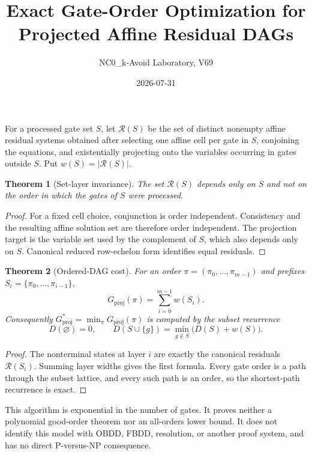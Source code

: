 \documentclass[11pt]{article}
\newtheorem{theorem}{Theorem}
\begin{document}
\title{Exact Gate-Order Optimization for Projected Affine Residual DAGs}
\author{NC0\_k-Avoid Laboratory, V69}
\date{2026-07-31}
\maketitle

For a processed gate set $S$, let $\mathcal R(S)$ be the set of distinct nonempty affine residual systems obtained after selecting one affine cell per gate in $S$, conjoining the equations, and existentially projecting onto the variables occurring in gates outside $S$. Put $w(S)=|\mathcal R(S)|$.

\begin{theorem}[Set-layer invariance]
The set $\mathcal R(S)$ depends only on $S$ and not on the order in which the gates of $S$ were processed.
\end{theorem}
\begin{proof}
For a fixed cell choice, conjunction is order independent. Consistency and the resulting affine solution set are therefore order independent. The projection target is the variable set used by the complement of $S$, which also depends only on $S$. Canonical reduced row-echelon form identifies equal residuals.
\end{proof}

\begin{theorem}[Ordered-DAG cost]
For an order $\pi=(\pi_0,\ldots,\pi_{m-1})$ and prefixes $S_i=\{\pi_0,\ldots,\pi_{i-1}\}$,
\[
G_{\mathrm{proj}}(\pi)=\sum_{i=0}^{m-1} w(S_i).
\]
Consequently $G^*_{\mathrm{proj}}=\min_\pi G_{\mathrm{proj}}(\pi)$ is computed by the subset recurrence
\[
D(\varnothing)=0,\qquad D(S\cup\{g\})=\min_{g\notin S}\bigl(D(S)+w(S)\bigr).
\]
\end{theorem}
\begin{proof}
The nonterminal states at layer $i$ are exactly the canonical residuals $\mathcal R(S_i)$. Summing layer widths gives the first formula. Every gate order is a path through the subset lattice, and every such path is an order, so the shortest-path recurrence is exact.
\end{proof}

This algorithm is exponential in the number of gates. It proves neither a polynomial good-order theorem nor an all-orders lower bound. It does not identify this model with OBDD, FBDD, resolution, or another proof system, and has no direct P-versus-NP consequence.
\end{document}
